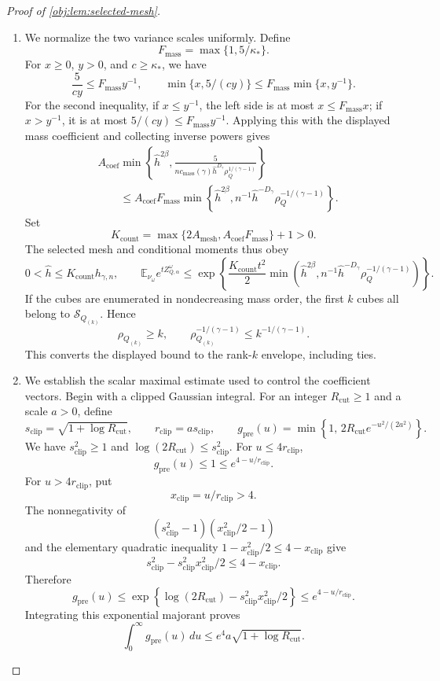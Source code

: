 \begin{proof}[Proof of \cref{obj:lem:selected-mesh}]
\begin{enumerate}
\item We normalize the two variance scales uniformly. Define
\[
F_{\mathrm{mass}}=\max\{1,5/\kappa_*\}.
\]
For \(x\ge0\), \(y>0\), and \(c\ge\kappa_*\), we have
\[
\frac5{cy}\le F_{\mathrm{mass}}y^{-1},
\qquad
\min\{x,5/(cy)\}
\le F_{\mathrm{mass}}\min\{x,y^{-1}\}.
\]
For the second inequality, if \(x\le y^{-1}\), the left side is at most
\(x\le F_{\mathrm{mass}}x\); if \(x>y^{-1}\), it is at most
\(5/(cy)\le F_{\mathrm{mass}}y^{-1}\).
Applying this with the displayed mass coefficient and collecting
inverse powers gives
\[
\begin{aligned}
&A_{\mathrm{coef}}
\min\!\left\{
\widehat h^{2\beta},
\frac5{
n c_{\mathrm{mass}}(\gamma)\widehat h^{D_\gamma}
\rho_Q^{1/(\gamma-1)}}
\right\}\\
&\qquad\le
A_{\mathrm{coef}}F_{\mathrm{mass}}
\min\!\left\{
\widehat h^{2\beta},
n^{-1}\widehat h^{-D_\gamma}\rho_Q^{-1/(\gamma-1)}
\right\}.
\end{aligned}
\]
Set
\[
K_{\mathrm{count}}
=
\max\{2A_{\mathrm{mesh}},A_{\mathrm{coef}}F_{\mathrm{mass}}\}+1>0.
\]
The selected mesh and conditional moments thus obey
\[
0<\widehat h\le K_{\mathrm{count}}h_{\gamma,n},
\qquad
\mathbb E_{\nu_\omega}e^{tZ_{Q,\alpha}^\omega}
\le
\exp\!\left\{
\frac{K_{\mathrm{count}}t^2}{2}
\min\!\left(
\widehat h^{2\beta},
n^{-1}\widehat h^{-D_\gamma}\rho_Q^{-1/(\gamma-1)}
\right)
\right\}.
\]
If the cubes are enumerated in nondecreasing mass order, the first \(k\)
cubes all belong to \(\mathcal S_{Q_{(k)}}\). Hence
\[
\rho_{Q_{(k)}}\ge k,
\qquad
\rho_{Q_{(k)}}^{-1/(\gamma-1)}
\le k^{-1/(\gamma-1)}.
\]
This converts the displayed bound to the rank-\(k\) envelope, including
ties.

\item We establish the scalar maximal estimate used to control the
coefficient vectors. Begin with a clipped Gaussian integral. For an
integer \(R_{\mathrm{cut}}\ge1\) and a scale \(a>0\), define
\[
s_{\mathrm{clip}}=\sqrt{1+\log R_{\mathrm{cut}}},
\qquad
r_{\mathrm{clip}}=a s_{\mathrm{clip}},
\qquad
g_{\mathrm{pre}}(u)
=
\min\!\left\{1,\,
2R_{\mathrm{cut}}e^{-u^2/(2a^2)}\right\}.
\]
We have \(s_{\mathrm{clip}}^2\ge1\) and
\(\log(2R_{\mathrm{cut}})\le s_{\mathrm{clip}}^2\).
For \(u\le4r_{\mathrm{clip}}\),
\[
g_{\mathrm{pre}}(u)\le1\le e^{4-u/r_{\mathrm{clip}}}.
\]
For \(u>4r_{\mathrm{clip}}\), put
\[
x_{\mathrm{clip}}=u/r_{\mathrm{clip}}>4.
\]
The nonnegativity of
\[
(s_{\mathrm{clip}}^2-1)(x_{\mathrm{clip}}^2/2-1)
\]
and the elementary quadratic inequality
\(1-x_{\mathrm{clip}}^2/2\le4-x_{\mathrm{clip}}\) give
\[
s_{\mathrm{clip}}^2
-s_{\mathrm{clip}}^2x_{\mathrm{clip}}^2/2
\le4-x_{\mathrm{clip}}.
\]
Therefore
\[
g_{\mathrm{pre}}(u)
\le
\exp\!\left\{
\log(2R_{\mathrm{cut}})
-s_{\mathrm{clip}}^2x_{\mathrm{clip}}^2/2
\right\}
\le e^{4-u/r_{\mathrm{clip}}}.
\]
Integrating this exponential majorant proves
\[
\int_0^\infty g_{\mathrm{pre}}(u)\,du
\le e^4a\sqrt{1+\log R_{\mathrm{cut}}}.
\]


\end{enumerate}
\end{proof}
